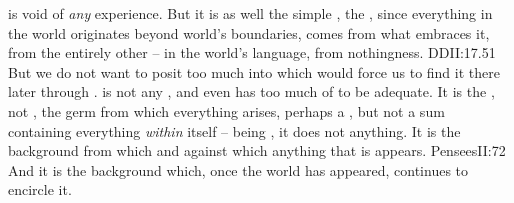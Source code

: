 \pa {} is void of {\em any} experience.  But it is as well the
simple , the , since everything in the world originates
beyond world's boundaries, comes from what embraces it, from the entirely other
-- in the world's language, from nothingness. \citet{Sacred ignorance teaches me
  that which seems to the intellect to be nothing is the incomprehensible
  Maximum}{DDI}{I:17.51} But we do not want to posit too much into
 which would force us to find it there later through .   is not any , and even  has too much of  to be adequate. It is the ,
not  , the germ from which everything arises, perhaps a
, but not a sum containing everything {\em within} itself -- being
, it does not  anything.  It is the background from
which and against which anything that is appears.  \citet{All things proceed
  from the Nothing, and are borne towards the Infinite.}{Pensees}{II:72} And it
is the background which, once the world has appeared, continues to encircle it.



